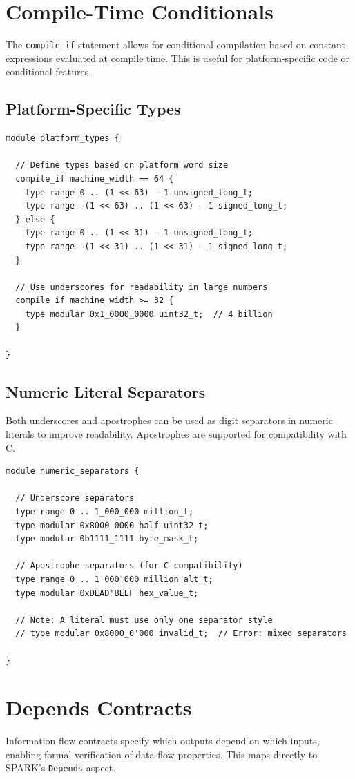 \documentclass[11pt,letterpaper,twoside,openany]{book}
\begin{document}
\section{Compile-Time Conditionals}
The \verb'compile_if' statement allows for conditional compilation based on constant expressions evaluated at compile time. This is useful for platform-specific code or conditional features.

\subsection{Platform-Specific Types}
\begin{lstlisting}
module platform_types {

  // Define types based on platform word size
  compile_if machine_width == 64 {
    type range 0 .. (1 << 63) - 1 unsigned_long_t;
    type range -(1 << 63) .. (1 << 63) - 1 signed_long_t;
  } else {
    type range 0 .. (1 << 31) - 1 unsigned_long_t;
    type range -(1 << 31) .. (1 << 31) - 1 signed_long_t;
  }

  // Use underscores for readability in large numbers
  compile_if machine_width >= 32 {
    type modular 0x1_0000_0000 uint32_t;  // 4 billion
  }

}
\end{lstlisting}

\subsection{Numeric Literal Separators}
Both underscores and apostrophes can be used as digit separators in numeric literals to improve readability. Apostrophes are supported for compatibility with C.
\begin{lstlisting}
module numeric_separators {

  // Underscore separators
  type range 0 .. 1_000_000 million_t;
  type modular 0x8000_0000 half_uint32_t;
  type modular 0b1111_1111 byte_mask_t;

  // Apostrophe separators (for C compatibility)
  type range 0 .. 1'000'000 million_alt_t;
  type modular 0xDEAD'BEEF hex_value_t;

  // Note: A literal must use only one separator style
  // type modular 0x8000_0'000 invalid_t;  // Error: mixed separators

}
\end{lstlisting}

\section{Depends Contracts}
Information-flow contracts specify which outputs depend on which inputs, enabling
formal verification of data-flow properties.  This maps directly to SPARK's
\verb'Depends' aspect.
\end{document}
